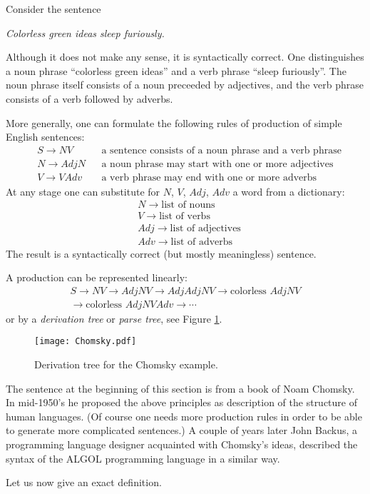 

\setcounter{section}{5}
\setcounter{subsection}{1}
\setcounter{dfn}{0}

\label{sec:LangGram}
Consider the sentence
\begin{center}
\emph{Colorless green ideas sleep furiously.}
\end{center}
Although it does not make any sense, it is syntactically correct.
One distinguishes a noun phrase ``colorless green ideas'' and a verb phrase ``sleep furiously''.
The noun phrase itself consists of a noun preceeded by adjectives, and the verb phrase consists of a verb followed by adverbs.

More generally, one can formulate the following rules of production of simple English sentences:
\begin{align*}
&S \to NV &&\text{a sentence consists of a noun phrase and a verb phrase}\\
&N \to AdjN &&\text{a noun phrase may start with one or more adjectives}\\
&V \to VAdv &&\text{a verb phrase may end with one or more adverbs}
\end{align*}
At any stage one can substitute for $N$, $V$, $Adj$, $Adv$ a word from a dictionary:
\begin{align*}
&N \to \text{list of nouns}\\
&V \to \text{list of verbs}\\
&Adj \to \text{list of adjectives}\\
&Adv \to \text{list of adverbs}
\end{align*}
The result is a syntactically correct (but mostly meaningless) sentence.

A production can be represented linearly:
\begin{multline*}
S \to NV \to AdjNV \to AdjAdjNV \to \text{colorless }AdjNV\\
\to \text{colorless }AdjNVAdv \to \cdots 
\end{multline*}
or by a \emph{derivation tree} or \emph{parse tree}, see Figure \ref{fig:Chomsky}.

\begin{figure}[ht]
\begin{center}
\texttt{[image: Chomsky.pdf]}
\end{center}
\caption{Derivation tree for the Chomsky example.}
\label{fig:Chomsky}
\end{figure}

The sentence at the beginning of this section is from a book of Noam Chomsky.
In mid-1950's he proposed the above principles as description of the structure of human languages.
(Of course one needs more production rules in order to be able to generate more complicated sentences.)
A couple of years later John Backus, a programming language designer acquainted with Chomsky's ideas,
described the syntax of the ALGOL programming language in a similar way.

Let us now give an exact definition.


